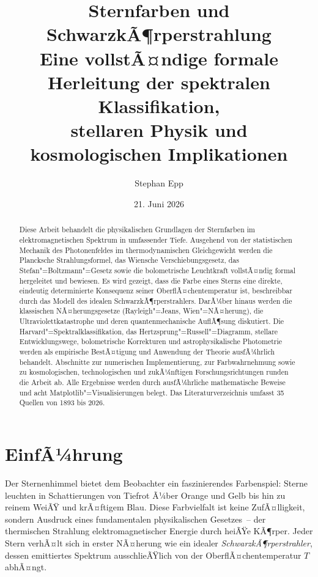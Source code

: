 ﻿\documentclass[a4paper,12pt]{article}
\title{\textbf{Sternfarben und SchwarzkÃ¶rperstrahlung}\\[0.5em]
\large Eine vollstÃ¤ndige formale Herleitung der spektralen Klassifikation,\\
stellaren Physik und kosmologischen Implikationen}
\author{Stephan Epp}
\date{21. Juni 2026}
\theoremstyle{definition}
\begin{document}
\maketitle

\begin{abstract}
Diese Arbeit behandelt die physikalischen Grundlagen der Sternfarben im elektromagnetischen
Spektrum in umfassender Tiefe. Ausgehend von der statistischen Mechanik des Photonenfeldes
im thermodynamischen Gleichgewicht werden die Plancksche Strahlungsformel, das Wiensche
Verschiebungsgesetz, das Stefan"=Boltzmann"=Gesetz sowie die bolometrische Leuchtkraft
vollstÃ¤ndig formal hergeleitet und bewiesen. Es wird gezeigt, dass die Farbe eines Sterns
eine direkte, eindeutig determinierte Konsequenz seiner OberflÃ¤chentemperatur ist,
beschreibbar durch das Modell des idealen SchwarzkÃ¶rperstrahlers. DarÃ¼ber hinaus werden
die klassischen NÃ¤herungsgesetze (Rayleigh"=Jeans, Wien"=NÃ¤herung), die Ultraviolettkatastrophe
und deren quantenmechanische AuflÃ¶sung diskutiert. Die Harvard"=Spektralklassifikation,
das Hertzsprung"=Russell"=Diagramm, stellare Entwicklungswege, bolometrische Korrekturen
und astrophysikalische Photometrie werden als empirische BestÃ¤tigung und Anwendung der
Theorie ausfÃ¼hrlich behandelt. Abschnitte zur numerischen Implementierung,
zur Farbwahrnehmung sowie zu kosmologischen, technologischen und zukÃ¼nftigen
Forschungsrichtungen runden die Arbeit ab. Alle Ergebnisse werden durch ausfÃ¼hrliche
mathematische Beweise und acht Matplotlib"=Visualisierungen belegt. Das Literaturverzeichnis
umfasst 35 Quellen von 1893 bis 2026.
\end{abstract}

\tableofcontents
\newpage

\section{EinfÃ¼hrung}

Der Sternenhimmel bietet dem Beobachter ein faszinierendes Farbenspiel: Sterne leuchten in
Schattierungen von Tiefrot Ã¼ber Orange und Gelb bis hin zu reinem WeiÃŸ und krÃ¤ftigem Blau.
Diese Farbvielfalt ist keine ZufÃ¤lligkeit, sondern Ausdruck eines fundamentalen physikalischen
Gesetzes~-- der thermischen Strahlung elektromagnetischer Energie durch heiÃŸe KÃ¶rper.
Jeder Stern verhÃ¤lt sich in erster NÃ¤herung wie ein idealer \emph{SchwarzkÃ¶rperstrahler},
dessen emittiertes Spektrum ausschlieÃŸlich von der OberflÃ¤chentemperatur $T$ abhÃ¤ngt.
\end{document}
